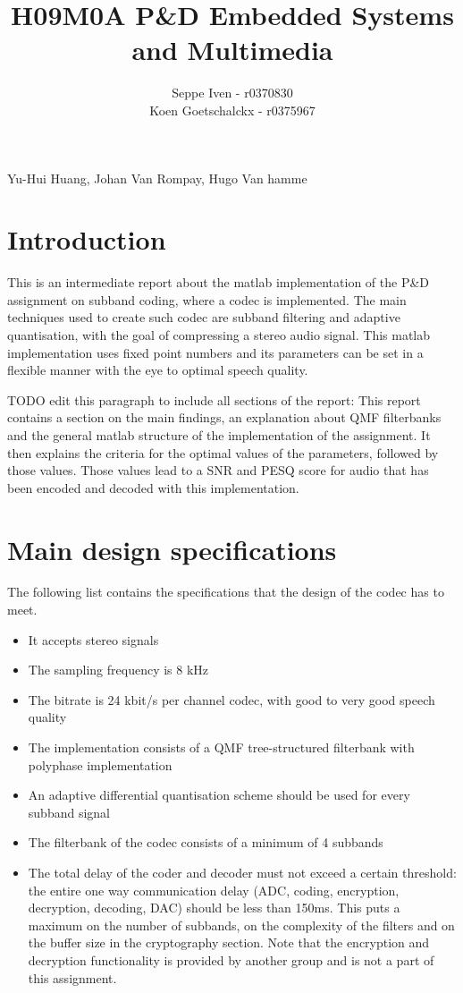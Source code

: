 \documentclass[a4paper]{article}
\title{H09M0A P\&D Embedded Systems and Multimedia}
\author{Seppe Iven - r0370830 \\ Koen Goetschalckx - r0375967}
\begin{document}
 
\maketitle
\begin{center} Yu-Hui Huang, Johan Van Rompay, Hugo Van hamme
\end{center}

\section{Introduction}
This is an intermediate report about the matlab implementation of the P\&D assignment on subband coding, where a codec is implemented. The main techniques used to create such codec are subband filtering and adaptive quantisation, with the goal of compressing a stereo audio signal. This matlab implementation uses fixed point numbers and its parameters can be set in a flexible manner with the eye to optimal speech quality. \

TODO edit this paragraph to include all sections of the report:
This report contains a section on the main findings, an explanation about QMF filterbanks and the general matlab structure of the implementation of the assignment. It then explains the criteria for the optimal values of the parameters, followed by those values. Those values lead to a SNR and PESQ score for audio that has been encoded and decoded with this implementation.

\section{Main design specifications}
The following list contains the specifications that the design of the codec has to meet.

\begin{itemize}
\item It accepts stereo signals
\item The sampling frequency is 8 kHz
\item The bitrate is 24 kbit/s per channel codec, with good to very good speech quality
\item The implementation consists of a QMF tree-structured filterbank with polyphase implementation
\item An adaptive differential quantisation scheme should be used for every subband signal
\item The filterbank of the codec consists of a minimum of 4 subbands
\item The total delay of the coder and decoder must not exceed a certain threshold: the entire one way communication delay (ADC, coding, encryption, decryption, decoding, DAC) should be less than 150ms. This puts a maximum on the number of subbands, on the complexity of the filters and on the buffer size in the cryptography section. Note that the encryption and decryption functionality is provided by another group and is not a part of this assignment.

\end{itemize}
\end{document}
